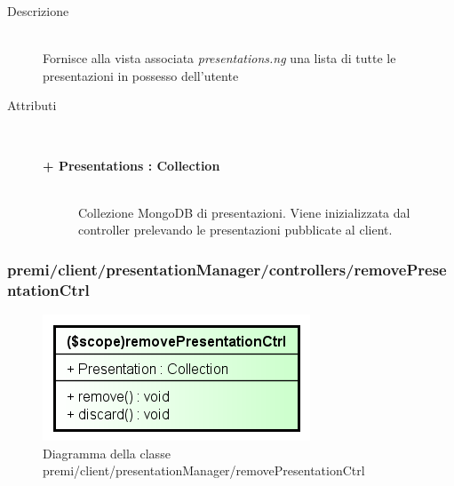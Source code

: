 \begin{description}
\item[Descrizione] \hfill \\
	Fornisce alla vista associata \textit{presentations.ng} una lista di tutte le presentazioni in possesso dell'utente
	
	
\item[Attributi] \hfill \\
	\begin{description}
		\item[\textbf{+ Presentations : Collection			}] \hfill \\
			Collezione MongoDB di presentazioni. Viene inizializzata dal controller prelevando le presentazioni pubblicate al client.
	\end{description}

\end{description}





\subsubsection{premi/client/presentationManager/controllers/removePresentationCtrl}
\begin{figure}[h]
\begin{center}
\includegraphics[scale=0.90]{img/diacla/removePresentationCtrl.png}
\caption{Diagramma della classe premi/client/presentationManager/removePresentationCtrl}
\end{center}
\end{figure}




